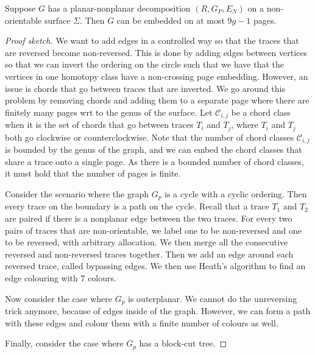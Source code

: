 \begin{lemma}\label{lem:planar_nonplanar_nonorientable}
	Suppose \(G\) has a planar-nonplanar decomposition \((R, G_P, E_N)\) on a non-orientable surface \(\Sigma\). Then \(G\) can be embedded on at most \(9g - 1\) pages.
\end{lemma}
\begin{proof}[Proof sketch]
	We want to add edges in a controlled way so that the traces that are reversed become non-reversed. This is done by adding edges between vertices so that we can invert the ordering on the circle such that we have that the vertices in one homotopy class have a non-crossing page embedding. However, an issue is chords that go between traces that are inverted. We go around this problem by removing chords and adding them to a separate page where there are finitely many pages wrt to the genus of the surface. Let \(\mathcal{C}_{i,j}\) be a chord class when it is the set of chords that go between traces \(T_i\) and \(T_j\), where \(T_i\) and \(T_j\) both go clockwise or counterclockwise. Note that the number of chord classes \(\mathcal{C}_{i,j}\) is bounded by the genus of the graph, and we can embed the chord classes that share a trace onto a single page. As there is a bounded number of chord classes, it must hold that the number of pages is finite.

	Consider the scenario where the graph $G_p$ is a cycle with a cyclic ordering. Then every trace on the boundary is a path on the cycle. Recall that a trace $T_1$ and $T_2$ are paired if there is a nonplanar edge between the two traces. For every two pairs of traces that are non-orientable, we label one to be non-reversed and one to be reversed, with arbitrary allocation. We then merge all the consecutive reversed and non-reversed traces together. Then we add an edge around each reversed trace, called bypassing edges. We then use Heath's algorithm to find an edge colouring with 7 colours.

	Now consider the case where $G_p$ is outerplanar. We cannot do the unreversing trick anymore, because of edges inside of the graph. However, we can form a path with these edges and colour them with a finite number of colours as well.

	Finally, consider the case where $G_p$ has a block-cut tree.
\end{proof}
